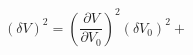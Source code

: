 \begin{equation}
\label{eq:deltaV}
\left(\delta V\right)^2 = \left( \frac{\partial{V}}{\partial{V_0}}\right)^2 (\delta V_0)^2 + 
\end{equation}